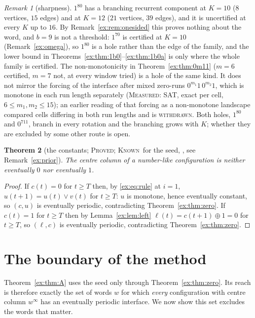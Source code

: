\documentclass[11pt]{article}
\newtheorem{theorem}{Theorem}[section]
\theoremstyle{definition}
\theoremstyle{remark}
\newtheorem{remark}[theorem]{Remark}
\newcommand{\PROVED}{\textsc{Proved}}
\newcommand{\MEASURED}{\textsc{Measured}}
\newcommand{\KNOWN}{\textsc{Known}}
\begin{document}
\begin{remark}[sharpness]
$1^80$ has a branching recurrent component at $K=10$ ($8$ vertices, $15$ edges) and at $K=12$ ($21$ vertices, $39$ edges), and it is uncertified at every $K$ up to $16$. By Remark~\ref{ex:rem:onesided} this proves nothing about the word, and $b=9$ is not a threshold: $1^70$ is certified at $K=10$ (Remark~\ref{ex:omega}), so $1^80$ is a hole rather than the edge of the family, and the lower bound in Theorems~\ref{ex:thm:1b0}--\ref{ex:thm:1b0a} is only where the whole family is certified. The non-monotonicity in Theorem~\ref{ex:thm:0m11} ($m=6$ certified, $m=7$ not, at every window tried) is a hole of the same kind. It does not mirror the forcing of the interface after mixed zero-runs $0^{m_1}1\,0^{m_2}1$, which is monotone in each run length separately (\MEASURED: SAT, exact per cell, $6\le m_1,m_2\le15$); an earlier reading of that forcing as a non-monotone landscape compared cells differing in both run lengths and is \textsc{withdrawn}. Both holes, $1^80$ and $0^711$, branch in every rotation and the branching grows with $K$; whether they are excluded by some other route is open.
\end{remark}

\begin{theorem}[the constants; \PROVED; \KNOWN\ for the seed, \cite{WRyan,Woffinden,Condrey,Cochon,Dib}, see Remark~\ref{ex:prior}]\label{ex:thm:const}
The centre column of a number-like configuration is neither eventually $0$ nor eventually $1$.
\end{theorem}
\begin{proof}
If $c(t)=0$ for $t\ge T$ then, by \eqref{ex:eq:rule} at $i=1$, $u(t+1)=u(t)\vee v(t)$ for $t\ge T$: $u$ is monotone, hence eventually constant, so $(c,u)$ is eventually periodic, contradicting Theorem~\ref{ex:thm:zero}. If $c(t)=1$ for $t\ge T$ then by Lemma~\ref{ex:lem:left} $\ell(t)=c(t+1)\oplus1=0$ for $t\ge T$, so $(\ell,c)$ is eventually periodic, contradicting Theorem~\ref{ex:thm:zero}.
\end{proof}

\section{The boundary of the method}\label{ex:sec:boundary}

Theorem~\ref{ex:thm:A} uses the seed only through Theorem~\ref{ex:thm:zero}. Its reach is therefore exactly the set of words $w$ for which \emph{every} configuration with centre column $w^\infty$ has an eventually periodic interface. We now show this set excludes the words that matter.
\end{document}
